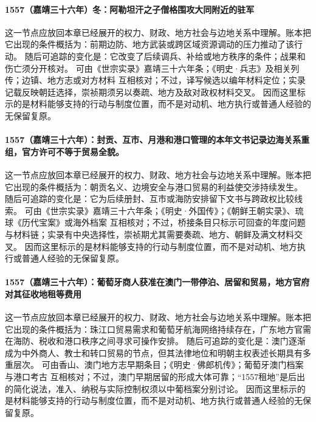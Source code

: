 \paragraph{1557（嘉靖三十六年）冬：阿勒坦汗之子僧格围攻大同附近的驻军} 这一节点应放回本章已经展开的权力、财政、地方社会与边地关系中理解。账本把它出现的条件概括为：前期边防、地方武装或跨区域资源调动的压力推动了该行动。 随后可追踪的变化是：它改变了后续调兵、补给或地方秩序的条件；战果和伤亡须分开核对。 可由《世宗实录》嘉靖三十六年条；《明史·兵志》及相关列传；边镇、地方志或对方材料 互相核对；不过，译写候选以编年材料定位；实录记载反映朝廷选择，崇祯期须另以奏疏、地方及敌对政权材料交叉。 因而这里标示的是材料能够支持的行动与制度位置，而不是对动机、地方执行或普通人经验的无保留复原。

\paragraph{1557（嘉靖三十六年）：封贡、互市、月港和港口管理的本年文书记录边海关系重组，官方许可不等于贸易全貌。} 这一节点应放回本章已经展开的权力、财政、地方社会与边地关系中理解。账本把它出现的条件概括为：朝贡名义、边境安全与港口贸易的利益使交涉持续发生。 随后可追踪的变化是：它为后续册封、互市或海防安排留下文书与跨政权比较线索。 可由《世宗实录》嘉靖三十六年条；《明史·外国传》；《朝鲜王朝实录》、琉球《历代宝案》或海外档案 互相核对；不过，桥接条目只标示可回查的年度问题与材料链；实录有中央选择性，崇祯期尤其需要奏疏、地方、朝鲜及满文材料交叉。 因而这里标示的是材料能够支持的行动与制度位置，而不是对动机、地方执行或普通人经验的无保留复原。

\paragraph{1557（嘉靖三十六年）：葡萄牙商人获准在澳门一带停泊、居留和贸易，地方官府对其征收地租等费用} 这一节点应放回本章已经展开的权力、财政、地方社会与边地关系中理解。账本把它出现的条件概括为：珠江口贸易需求和葡萄牙航海网络持续存在，广东地方官需在海防、税收和港口秩序之间寻求可操作安排。 随后可追踪的变化是：澳门逐渐成为中外商人、教士和转口贸易的节点，但其法律地位和明朝主权表述长期具有多重层次。 可由香山、澳门地方志早期条目；《明史·佛郎机传》；葡萄牙澳门档案与港口考古 互相核对；不过，澳门早期居留的形成大体可靠；“1557租地”是后出的简化说法，准入、纳税与实际控制权须以中葡档案分别讨论。 因而这里标示的是材料能够支持的行动与制度位置，而不是对动机、地方执行或普通人经验的无保留复原。

